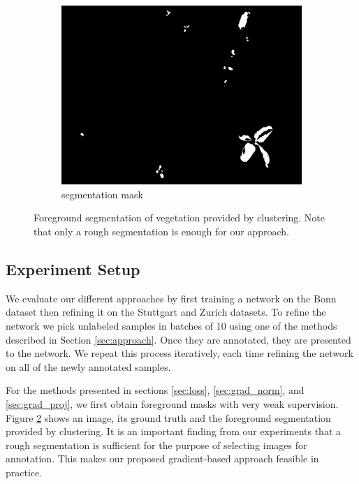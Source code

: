 \begin{figure}
\begin{subfigure}[b]{0.31\linewidth}
    \includegraphics[width=\linewidth]{pics/unsupervised/lbl_masks_8mm_fromImages_frame256.png}
   		\caption{segmentation mask}
		\label{unsup_lbl}    		
   \end{subfigure}
    \caption{Foreground segmentation of vegetation provided by clustering. Note that only a rough segmentation is enough for our approach.}
    \label{fig:unsupervised_foreground}
\end{figure}


\subsection{Experiment Setup}

We evaluate our different approaches by first training a network on the Bonn dataset then refining it on the Stuttgart and Zurich datasets. To refine the network we pick unlabeled samples in batches of 10 using one of the methods described in Section \ref{sec:approach}. Once they are annotated, they are presented to the network. We repeat this process iteratively, each time refining the network on all of the newly annotated samples. 

For the methods presented in sections \ref{sec:loss}, \ref{sec:grad_norm}, and \ref{sec:grad_proj}, we first obtain foreground masks with very weak supervision. Figure  \ref{fig:unsupervised_foreground} shows an image, its ground truth and the foreground segmentation provided by clustering. It is an important finding from our experiments that a rough segmentation is sufficient for the purpose of selecting images for annotation. This makes our proposed gradient-based approach feasible in practice.

